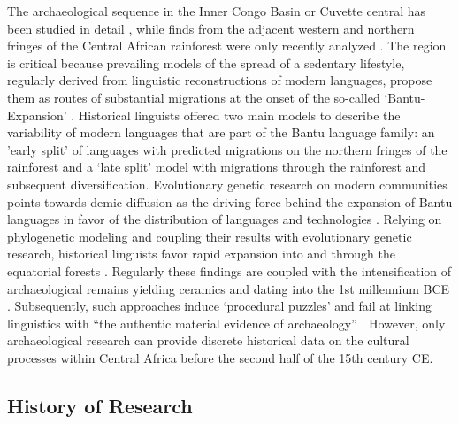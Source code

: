 \documentclass[smallextended,natbib]{svjour3}       %
\begin{document}
The archaeological sequence in the Inner Congo Basin or Cuvette central has been studied in detail \citep{Wotzka.1995}, while finds from the adjacent western and northern fringes of the Central African rainforest were only recently analyzed \citep{Seidensticker.2021e}. The region is critical because prevailing models of the spread of a sedentary lifestyle, regularly derived from linguistic reconstructions of modern languages, propose them as routes of substantial migrations at the onset of the so-called ‘Bantu-Expansion’ \citep{Bostoen.2018,Bostoen.2020}. Historical linguists offered two main models to describe the variability of modern languages that are part of the Bantu language family: an 'early split' of languages with predicted migrations on the northern fringes of the rainforest and a ‘late split’ model with migrations through the rainforest and subsequent diversification. Evolutionary genetic research on modern communities points towards demic diffusion as the driving force behind the expansion of Bantu languages in favor of the distribution of languages and technologies \citep{Bostoen.2022,Pakendorf.2011}. Relying on phylogenetic modeling and coupling their results with evolutionary genetic research, historical linguists favor rapid expansion into and through the equatorial forests \citep{Currie.2013,Bostoen.2015,Grollemund.2015,Koile.2022,Grollemund.2023}. Regularly these findings are coupled with the intensification of archaeological remains yielding ceramics and dating into the 1st millennium BCE \citep{deSaulieu.2021a,Seidensticker.2021}. Subsequently, such approaches induce ‘procedural puzzles’ and fail at linking linguistics with “the authentic material evidence of archaeology” \cite[88]{Eggert.2016a}. However, only archaeological research can provide discrete historical data on the cultural processes within Central Africa before the second half of the 15th century CE.

\subsection*{History of Research}
\end{document}
